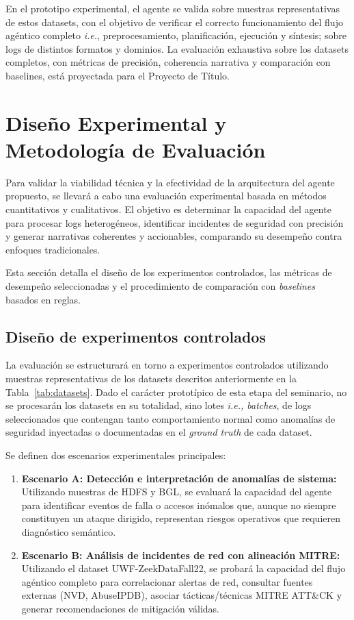 En el prototipo experimental, el
agente se valida sobre muestras representativas de estos
datasets, con el objetivo de verificar el correcto funcionamiento
del flujo agéntico completo \textit{i.e.},  preprocesamiento, planificación,
ejecución y síntesis; sobre logs de distintos formatos y
dominios. La evaluación exhaustiva sobre los datasets
completos, con métricas de precisión, coherencia narrativa
y comparación con baselines, está proyectada para el
Proyecto de Título.

\section{Diseño Experimental y Metodología de Evaluación}

Para validar la viabilidad técnica y la efectividad de la arquitectura del agente propuesto, se llevará a cabo una evaluación experimental basada en métodos cuantitativos y cualitativos. El objetivo es determinar la capacidad del agente para procesar logs heterogéneos, identificar incidentes de seguridad con precisión y generar narrativas coherentes y accionables, comparando su desempeño contra enfoques tradicionales.

Esta sección detalla el diseño de los experimentos controlados, las métricas de desempeño seleccionadas y el procedimiento de comparación con \textit{baselines} basados en reglas.

\subsection{Diseño de experimentos controlados}

La evaluación se estructurará en torno a experimentos controlados utilizando muestras representativas de los datasets descritos anteriormente en la Tabla~\ref{tab:datasets}. Dado el carácter prototípico de esta etapa del seminario, no se procesarán los datasets en su totalidad, sino lotes \textit{i.e., batches}, de logs seleccionados que contengan tanto comportamiento normal como anomalías de seguridad inyectadas o documentadas en el \textit{ground truth} de cada dataset.

Se definen dos escenarios experimentales principales:

\begin{enumerate}
    \item \textbf{Escenario A: Detección e interpretación de anomalías de sistema:} Utilizando muestras de HDFS y BGL, se evaluará la capacidad del agente para identificar eventos de falla o accesos inómalos que, aunque no siempre constituyen un ataque dirigido, representan riesgos operativos que requieren diagnóstico semántico.
    \item \textbf{Escenario B: Análisis de incidentes de red con alineación MITRE:} Utilizando el dataset UWF-ZeekDataFall22, se probará la capacidad del flujo agéntico completo para correlacionar alertas de red, consultar fuentes externas (NVD, AbuseIPDB), asociar tácticas/técnicas MITRE ATT\&CK y generar recomendaciones de mitigación válidas.
\end{enumerate}

